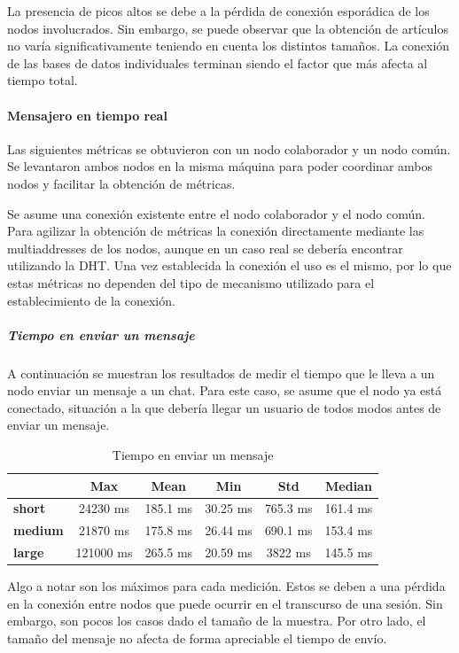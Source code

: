 La presencia de picos altos se debe a la pérdida de conexión esporádica de los nodos involucrados. Sin embargo, se puede observar que la obtención de artículos no varía significativamente teniendo en cuenta los distintos tamaños. La conexión de las bases de datos individuales terminan siendo el factor que más afecta al tiempo total.

\paragraph{Mensajero en tiempo real}

Las siguientes métricas se obtuvieron con un nodo colaborador y un nodo común. Se levantaron ambos nodos en la misma máquina para poder coordinar ambos nodos y facilitar la obtención de métricas.

Se asume una conexión existente entre el nodo colaborador y el nodo común. Para agilizar la obtención de métricas la conexión directamente mediante las multiaddresses de los nodos, aunque en un caso real se debería encontrar utilizando la DHT. Una vez establecida la conexión el uso es el mismo, por lo que estas métricas no dependen del tipo de mecanismo utilizado para el establecimiento de la conexión.

\subparagraph{Tiempo en enviar un mensaje}

A continuación se muestran los resultados de medir el tiempo que le lleva a un nodo enviar un mensaje a un chat. Para este caso, se asume que el nodo ya está conectado, situación a la que debería llegar un usuario de todos modos antes de enviar un mensaje.

\setlength\tabcolsep{10pt}
\begin{table}[!htbp]
    \centering
    \begin{tabular}{|l|c|c|c|c|c|}
        \hline
        & \textbf{Max} & \textbf{Mean} & \textbf{Min} & \textbf{Std} & \textbf{Median} \\ \hline
        \textbf{short} & 24230 ms & 185.1 ms & 30.25 ms & 765.3 ms & 161.4 ms \\ \hline
        \textbf{medium} & 21870 ms & 175.8 ms & 26.44 ms & 690.1 ms & 153.4 ms \\ \hline
        \textbf{large} & 121000 ms & 265.5 ms & 20.59 ms & 3822 ms & 145.5 ms \\ \hline
    \end{tabular}
    \caption{Tiempo en enviar un mensaje}
\end{table}

Algo a notar son los máximos para cada medición. Estos se deben a una pérdida en la conexión entre nodos que puede ocurrir en el transcurso de una sesión. Sin embargo, son pocos los casos dado el tamaño de la muestra. Por otro lado, el tamaño del mensaje no afecta de forma apreciable el tiempo de envío.

